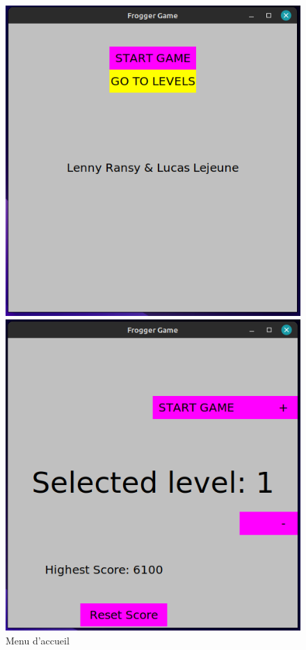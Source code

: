 \documentclass[a4paper, 12pt]{article}
\begin{document}
\begin{figure}[h]
    \centering
    \begin{minipage}{0.3\textwidth}
      \centering
      \includegraphics[width=\linewidth]{Images/welcomescreen.png}
      \caption{Menu d'accueil}
    \end{minipage}
    \hfill
    \begin{minipage}{0.3\textwidth}
      \centering
      \vspace{0.35cm}
      \includegraphics[width=\linewidth]{Images/levelselector.png}

\end{minipage}
\end{figure}
\end{document}
